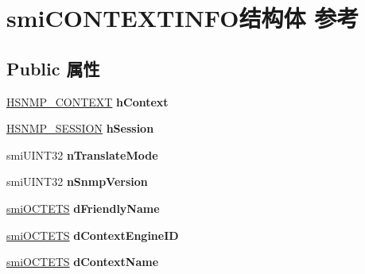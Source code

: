 \hypertarget{structsmi_c_o_n_t_e_x_t_i_n_f_o}{}\section{smi\+C\+O\+N\+T\+E\+X\+T\+I\+N\+F\+O结构体 参考}
\label{structsmi_c_o_n_t_e_x_t_i_n_f_o}
\subsection*{Public 属性}
\begin{DoxyCompactItemize}
\item 
\mbox{\label{structsmi_c_o_n_t_e_x_t_i_n_f_o_af362f6d73110996824c1943438cbb2ab}} 
\hyperlink{interfacevoid}{H\+S\+N\+M\+P\+\_\+\+C\+O\+N\+T\+E\+XT} {\bfseries h\+Context}
\item 
\mbox{\label{structsmi_c_o_n_t_e_x_t_i_n_f_o_a0de7ac5a2c3119fdf53283641465c3d8}} 
\hyperlink{interfacevoid}{H\+S\+N\+M\+P\+\_\+\+S\+E\+S\+S\+I\+ON} {\bfseries h\+Session}
\item 
\mbox{\label{structsmi_c_o_n_t_e_x_t_i_n_f_o_ad4bde2d6e9d581d8419499d002494257}} 
smi\+U\+I\+N\+T32 {\bfseries n\+Translate\+Mode}
\item 
\mbox{\label{structsmi_c_o_n_t_e_x_t_i_n_f_o_abc39d43281cd8cf140a55166a8921737}} 
smi\+U\+I\+N\+T32 {\bfseries n\+Snmp\+Version}
\item 
\mbox{\label{structsmi_c_o_n_t_e_x_t_i_n_f_o_a307d1380f399c6d7cd1b33c1ec571f07}} 
\hyperlink{structsmi_o_c_t_e_t_s}{smi\+O\+C\+T\+E\+TS} {\bfseries d\+Friendly\+Name}
\item 
\mbox{\label{structsmi_c_o_n_t_e_x_t_i_n_f_o_a2872abb36efdce1441ad9f4fe12b1a0a}} 
\hyperlink{structsmi_o_c_t_e_t_s}{smi\+O\+C\+T\+E\+TS} {\bfseries d\+Context\+Engine\+ID}
\item 
\mbox{\label{structsmi_c_o_n_t_e_x_t_i_n_f_o_a23d4cb90134578833ead97a0383ce6aa}} 
\hyperlink{structsmi_o_c_t_e_t_s}{smi\+O\+C\+T\+E\+TS} {\bfseries d\+Context\+Name}

\end{DoxyCompactItemize}
